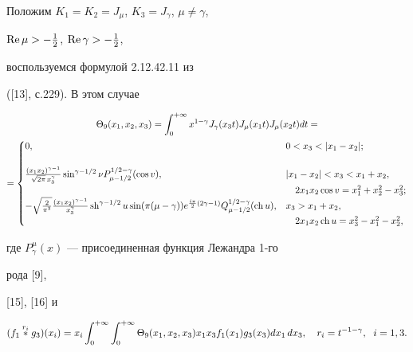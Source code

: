 \begin{exam}


Положим $K_1=K_2=J_\mu$, $K_3=J_\gamma$, $\mu\ne \gamma$,


$\operatorname{Re}\mu>-\frac{1}{2}$, $\operatorname{Re}\gamma>-\frac{1}{2}$,


воспользуемся формулой 2.12.42.11 из


([13], с.229). В этом случае


\begin{multline*}


\Theta_9(x_1,x_2,x_3)=\int^{+\infty}_0 x^{1-\gamma}J_\gamma


(x_3t)J_\mu(x_1t)J_\mu(x_2t)dt =\\


=


\begin{cases}


0, & 0<x_3<|x_1-x_2|;\\


& \\


\frac{(x_1x_2)^{\gamma-1}}{\sqrt{2\pi}\,x^\gamma_3}


\sin^{\gamma-1/2}\nu P^{1/2-\gamma}_{\mu-1/2}(\cos v),


& |x_1-x_2|<x_3<x_1+x_2,\\


& \quad 2x_1x_2\cos v=x^2_1+x^2_2-x^2_3;\\


-\sqrt{\frac{2}{\pi^3}}\frac{(x_1x_2)^{\gamma-1}}{x^\gamma_3}


\sh^{\gamma-1/2}u\sin(\pi(\mu-\gamma))e^{\frac{i\pi}{2}(2\gamma-1)}


Q^{1/2-\gamma}_{\mu-1/2}(\ch u),


& x_3>x_1+x_2,\\


& \quad 2x_1x_2\ch u=x^2_3-x^2_1-x^2_2,


\end{cases}


\end{multline*}


где $P^\mu_\gamma(x)$ --- присоединенная функция Лежандра 1-го


рода [9],


[15], [16] и


$$


(f_1\up{r_i}{}g_3)(x_i)=x_i \int^{+\infty}_0 \int^{+\infty}_0


\Theta_9(x_1,x_2,x_3)x_1x_3f_1(x_1)g_3(x_3)dx_1\,dx_3,\quad


r_i=t^{-1-\gamma},\ \; i=1,3.


$$


\end{exam}





